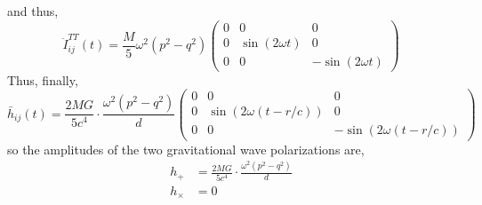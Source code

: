 \documentclass[12pt]{article}
\begin{document}
and thus,
\[ \ddot{I}^{TT}_{ij}(t) = \frac{M}{5} \omega^2 (p^2 - q^2) 
\begin{pmatrix}
0 & 0 & 0
\\
0 & \sin{(2 \omega t)} & 0
\\
0 & 0 & - \sin{(2 \omega t)}
\end{pmatrix} \]
Thus, finally,
\[ \bar{h}_{ij}(t) = \frac{2 MG}{5 c^4} \cdot \frac{\omega^2 (p^2 - q^2)}{d}  \begin{pmatrix}
0 & 0 & 0
\\
0 & \sin{(2 \omega (t - r/c))} & 0
\\
0 & 0 & - \sin{(2 \omega (t - r/c))}
\end{pmatrix} \]
so the amplitudes of the two gravitational wave polarizations are,
\begin{align*}
h_{+} & = \frac{2 MG}{5 c^4} \cdot \frac{\omega^2 (p^2 - q^2)}{d} 
\\
h_{\times} & = 0
\end{align*}
\end{document}
